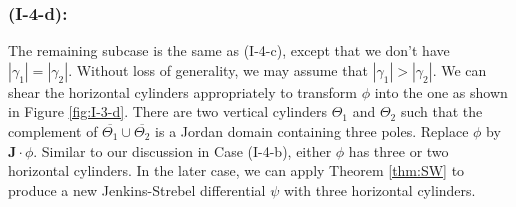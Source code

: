 \documentclass[11pt]{amsart}
\theoremstyle{plain}
\newcommand{\rot}{\mathbf{J}}
\begin{document}
\subsubsection*{\textbf{(I-4-d):}} 
The remaining subcase is the same as (I-4-c), except that we don't have 
 $|\gamma_1|=|\gamma_2|$. 
Without loss of generality, we may assume that $|\gamma_1| > |\gamma_2|$.
We can shear the horizontal cylinders appropriately to transform $\phi$ into the one as shown in Figure \ref{fig:I-3-d}. There are two vertical cylinders $\Theta_1$ and $\Theta_2$ such that the complement of  $\overline{\Theta_1}\cup\overline{ \Theta_2}$ is a Jordan domain containing 
three poles. Replace $\phi$ by $\rot \cdot \phi$. 
Similar to our discussion in Case (I-4-b), either $\phi$ has three or two horizontal cylinders.  
In the later case, we can apply Theorem \ref{thm:SW} to produce a new Jenkins-Strebel differential $\psi$ with three horizontal cylinders. 
\end{document}
